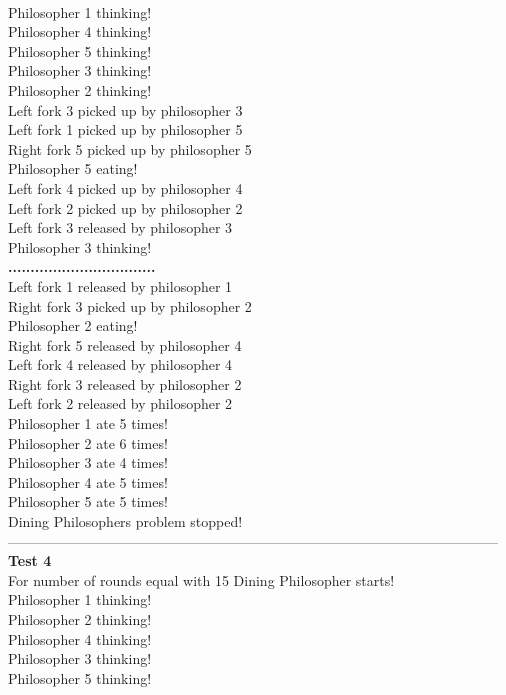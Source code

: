 \documentclass[14pt]{article}
\begin{document}
\\Philosopher 1 thinking!
\\Philosopher 4 thinking!
\\Philosopher 5 thinking!
\\Philosopher 3 thinking!
\\Philosopher 2 thinking!
\\Left fork 3 picked up by philosopher 3
\\Left fork 1 picked up by philosopher 5
\\Right fork 5 picked up by philosopher 5
\\Philosopher 5 eating!
\\Left fork 4 picked up by philosopher 4
\\Left fork 2 picked up by philosopher 2
\\Left fork 3 released by philosopher 3
\\Philosopher 3 thinking!
\\\textbf{.................................}
\\Left fork 1 released by philosopher 1
\\Right fork 3 picked up by philosopher 2
\\Philosopher 2 eating!
\\Right fork 5 released by philosopher 4
\\Left fork 4 released by philosopher 4
\\Right fork 3 released by philosopher 2
\\Left fork 2 released by philosopher 2
\\Philosopher 1 ate 5 times!
\\Philosopher 2 ate 6 times!
\\Philosopher 3 ate 4 times!
\\Philosopher 4 ate 5 times!
\\Philosopher 5 ate 5 times!
\\Dining Philosophers problem stopped!
\\---------------------------------------------------------------------------------------------------------
\\\textbf{Test 4}
\\For number of rounds equal with 15 Dining Philosopher starts!
\\Philosopher 1 thinking!
\\Philosopher 2 thinking!
\\Philosopher 4 thinking!
\\Philosopher 3 thinking!
\\Philosopher 5 thinking!
\end{document}
